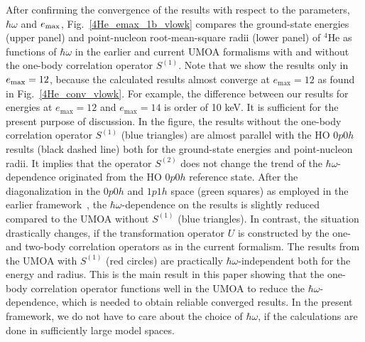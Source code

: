 \documentclass[aps,prc, dvips, twocolumn,groupedaddress,showkeys,showpacs,floatfix,superscriptaddress]{revtex4-1}
\newcommand{\<}{\langle}
\renewcommand{\>}{\rangle}
\begin{document}
After confirming the convergence of the results with respect to the parameters, $\hbar\omega$ and $e_{\rm max}$,
Fig.~\ref{4He_emax_1b_vlowk} compares the ground-state energies (upper panel)
and point-nucleon root-mean-square radii (lower panel) of
 $^{4}$He as functions of $\hbar\omega$ in the earlier and current UMOA formalisms
with and without the one-body correlation operator $S^{(1)}$.
Note that we show the results only in $e_{\rm max} = 12$, because
 the calculated results almost converge at $e_{\max} = 12$ as found in Fig.~\ref{4He_conv_vlowk}.
For example, the difference between our results for energies
  at $e_{\max} = 12$ and $e_{\max} = 14$ is order of 10 keV.
 It is sufficient for the present purpose of discussion.
In the figure, the results without the one-body correlation operator $S^{(1)}$ (blue triangles) are almost parallel
with the HO $0p0h$ results (black dashed line) both for the ground-state energies and point-nucleon radii.
It implies that the operator $S^{(2)}$ does not change the trend of the $\hbar\omega$-dependence originated from the HO $0p0h$ reference state.
After the diagonalization in the $0p0h$ and $1p1h$ space (green squares)
as employed in the earlier framework~\cite{Fujii:2004, Fujii:2009, Miyagi:2014, Miyagi:2015},
 the $\hbar\omega$-dependence on the results is slightly reduced compared to the UMOA without $S^{(1)}$ (blue triangles).
In contrast, the situation drastically changes, if the transformation operator $U$ is constructed
by the one- and two-body correlation operators as in the current formalism.
The results from the UMOA with $S^{(1)}$ (red circles) are practically $\hbar\omega$-independent both for the energy and radius.
This is the main result in this paper showing that the one-body correlation operator functions well in the UMOA
to reduce the $\hbar\omega$-dependence, which is needed to obtain reliable converged results.
In the present framework, we do not have to care about the choice of $\hbar\omega$, if the calculations
 are done in sufficiently large model spaces.
\end{document}
